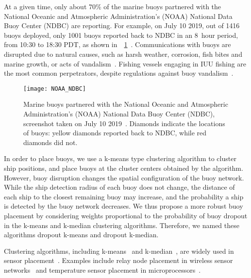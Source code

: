 \documentclass{article}
\begin{document}
At a given time, only about 70\% of the marine buoys partnered with the National Oceanic and Atmospheric Administration's (NOAA) National Data Buoy Center (NDBC) are reporting. For example, on July 10 2019, out of 1416 buoys deployed, only 1001 buoys reported back to NDBC in an 8~hour period, from 10:30 to 18:30 PDT, as shown in~\figurename~\ref{fig:noaa_ndbc}~\cite{noaa_ndbc}. Communications with buoys are disrupted due to natural causes, such as harsh weather, corrosion, fish bites and marine growth, or acts of vandalism~\cite{beets2014_buoyvandalism}. Fishing vessels engaging in IUU fishing are the most common perpetrators, despite regulations against buoy vandalism~\cite{dbcp2011_buoyvandalism}. 

\begin{figure}
    \centering
    \texttt{[image: NOAA\_NDBC]}
    \caption{Marine buoys partnered with the National Oceanic and Atmospheric Administration's (NOAA) National Data Buoy Center (NDBC), screenshot taken on July 10 2019~\cite{noaa_ndbc}. Diamonds indicate the locations of buoys: yellow diamonds reported back to NDBC, while red diamonds did not.}
    \label{fig:noaa_ndbc}
\end{figure}

In order to place buoys, we use a k-means type clustering algorithm to cluster ship positions, and place buoys at the cluster centers obtained by the algorithm. However, buoy disruption changes the spatial configuration of the buoy network. While the ship detection radius of each buoy does not change, the distance of each ship to the closest remaining buoy may increase, and the probability a ship is detected by the buoy network decreases. We thus propose a more robust buoy placement by considering weights proportional to the probability of buoy dropout in the k-means and k-median clustering algorithms. Therefore, we named these algorithms dropout k-means and dropout k-median.

Clustering algorithms, including k-means~\cite{steinhaus1956_kmeans,lloyd1982_kmeans} and k-median~\cite{charikar1999_kmedian,arora1998_kmedians}, are widely used in sensor placement~\cite{jain2010_kmeans}. Examples include relay node placement in wireless sensor networks~\cite{talgini2014_aerialnodeplacement,hajjar2017_relaynodeplacement} and temperature sensor placement in microprocessors~\cite{mukherjee2006_tempsensorplacement}. %
\end{document}
